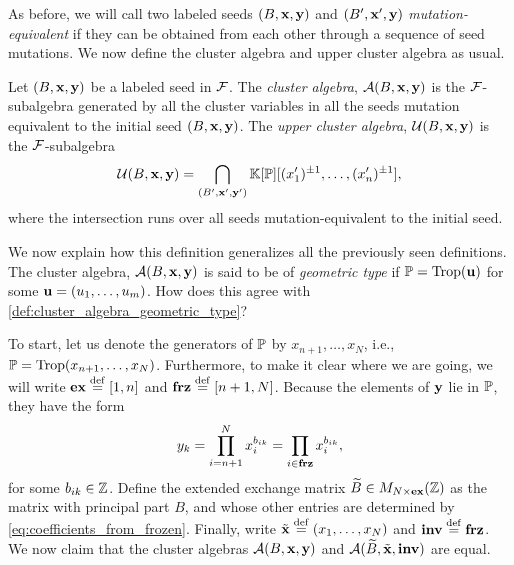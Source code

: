 As before, we will call two labeled seeds $(B, \mathbf{x}, \mathbf{y})$ and $(B', \mathbf{x}', \mathbf{y})$
\emph{mutation-equivalent} if they can be obtained from each
other through a sequence of seed mutations. We now define the cluster algebra and upper
cluster algebra as usual.
\begin{definition}

	Let $(B, \mathbf{x}, \mathbf{y})$ be a labeled seed in $\mathcal{F}$. The \emph{cluster
		algebra}, $\mathcal{A}(B,
		\mathbf{x}, \mathbf{y})$ is the $\mathcal{F}$-subalgebra generated by all
	the cluster variables in all the seeds mutation equivalent to the initial seed $(B,
		\mathbf{x}, \mathbf{y})$. The \emph{upper cluster algebra}, $\mathcal{U}(B, \mathbf{x}, \mathbf{y})$ is the $\mathcal{F}$-subalgebra
	\begin{equation*}
		\mathcal{U}(B, \mathbf{x}, \mathbf{y}) = \bigcap_{(B', \mathbf{x}', \mathbf{y}')} \mathbb{K}[\mathbb{P}][(x_1')^{\pm 1}, \dots, (x'_n)^{\pm 1}],
	\end{equation*}
	where the intersection runs over all seeds mutation-equivalent to the initial seed.
\end{definition}

We now explain how this definition generalizes all the previously seen definitions. The
cluster algebra, $\mathcal{A}(B, \mathbf{x}, \mathbf{y})$ is said to be of \emph{geometric
	type} if $\mathbb{P} = \operatorname{Trop}(\mathbf{u})$ for some $\mathbf{u} =
	(u_1, \dots, u_m)$. How does this agree with \cref{def:cluster_algebra_geometric_type}? 

To start, let us denote the generators of $\mathbb{P}$ by $x_{n+1}, \dots, x_N$, i.e., $\mathbb{P}
	= \operatorname{Trop}(x_{n+1}, \dots, x_N)$. Furthermore, to make it clear where we are going, we
will write $\mathbf{ex} \overset{\mathrm{def}}{=} [1, n]$ and $\mathbf{frz} \overset{\mathrm{def}}{=} [n+1, N]$. Because the elements of
$\mathbf{y}$ lie in $\mathbb{P}$, they have the form
\begin{equation}\label{eq:coefficients_from_frozen}
	y_k = \prod_{i = n+1}^N x_i^{b_{ik}} = \prod_{i \in \mathbf{frz}} x_i^{b_{ik}},
\end{equation}
%
for some $b_{ik} \in \mathbb{Z}$. Define the extended exchange matrix $\widetilde{B} \in M_{N \times
			\mathbf{ex}}(\mathbb{Z})$ as the matrix with principal part $B$, and whose other entries are
determined by \cref{eq:coefficients_from_frozen}. Finally, write $\tilde{\mathbf{x}} \overset{\mathrm{def}}{=} (x_1,
	\dots, x_N)$ and $\mathbf{inv} \overset{\mathrm{def}}{=} \mathbf{frz}$. We now claim that the cluster algebras $\mathcal{A}(B,
	\mathbf{x}, \mathbf{y})$ and $\mathcal{A}(\widetilde{B}, \tilde{\mathbf{x}}, \mathbf{inv})$ are equal.

